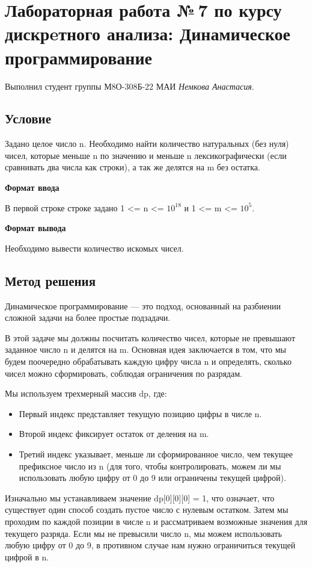 \documentclass[12pt]{article}
\begin{document}
\section*{Лабораторная работа №\,7 по курсу дискрeтного анализа: Динамическое программирование}

Выполнил студент группы М8О-308Б-22 МАИ \textit{Немкова Анастасия}.

\subsection*{Условие}
Задано целое число n. Необходимо найти количество натуральных (без нуля) чисел, которые меньше n по значению и меньше n лексикографически (если сравнивать два числа как строки), а так же делятся на m без остатка.

\textbf{Формат ввода}

В первой строке строке задано 1 <= n <= $10^{18}$ и  1 <= m <= $10^5$.

\textbf{Формат вывода}

Необходимо вывести количество искомых чисел.


\subsection*{Метод решения}

Динамическое программирование — это подход, основанный на разбиении сложной задачи на более простые подзадачи. 

В этой задаче мы должны посчитать количество чисел, которые не превышают заданное число n и делятся на m. Основная идея заключается в том, что мы будем поочередно обрабатывать каждую цифру числа n и определять, сколько чисел можно сформировать, соблюдая ограничения по разрядам.

Мы используем трехмерный массив dp, где:
\begin{itemize}
    \item Первый индекс представляет текущую позицию цифры в числе n.
    \item Второй индекс фиксирует остаток от деления на m.
    \item Третий индекс указывает, меньше ли сформированное число, чем текущее префиксное число из n (для того, чтобы контролировать, можем ли мы использовать любую цифру от 0 до 9 или ограничены текущей цифрой).
\end{itemize}

Изначально мы устанавливаем значение dp[0][0][0] = 1, что означает, что существует один способ создать пустое число с нулевым остатком. Затем мы проходим по каждой позиции в числе n и рассматриваем возможные значения для текущего разряда. Если мы не превысили число n, мы можем использовать любую цифру от 0 до 9, в противном случае нам нужно ограничиться текущей цифрой в n.
\end{document}
